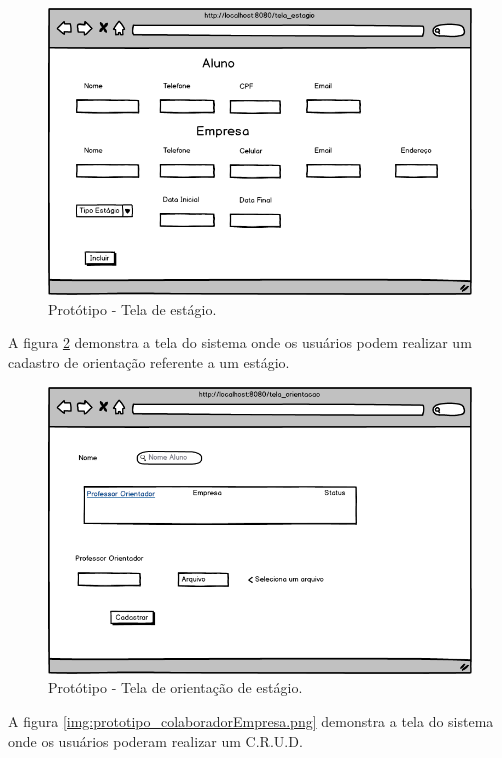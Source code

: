 \begin{figure}[!htb]
 \centering \includegraphics[scale=0.5]{imagens/prototipo_estagio.png}
 \caption{Protótipo - Tela de estágio.}
 \label{img:prototipo_estagio.png}
\end{figure}

A figura \ref{img:prototipo_orientacao.png} demonstra a tela do sistema onde os
usuários podem realizar um cadastro de orientação referente a um estágio.

\begin{figure}[!htb]
 \centering \includegraphics[scale=0.5]{imagens/prototipo_orientacao.png}
 \caption{Protótipo - Tela de orientação de estágio.}
 \label{img:prototipo_orientacao.png}
\end{figure}

A figura \ref{img:prototipo_colaboradorEmpresa.png} demonstra a tela do sistema
onde os usuários poderam realizar um C.R.U.D.

